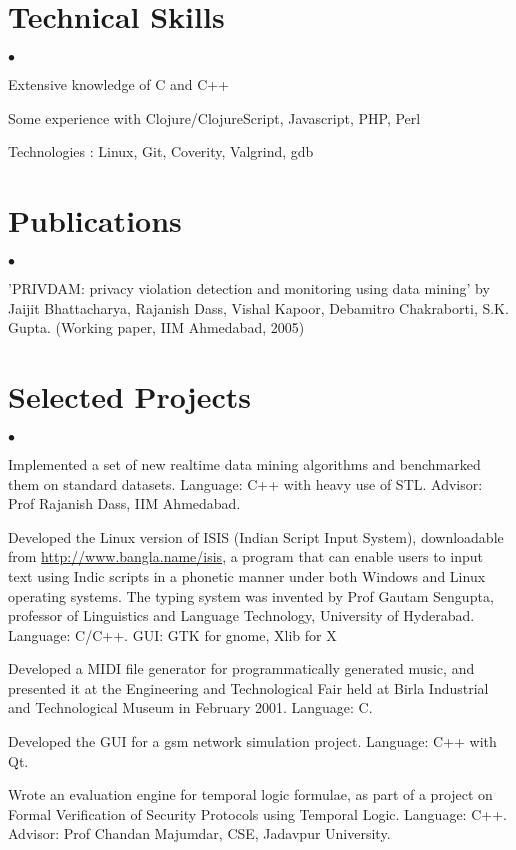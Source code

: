 \documentclass[margin,line]{res}
\newenvironment{list1}{
  \begin{list}{$\bullet$}{%
      \setlength{\itemsep}{0in}
      \setlength{\parsep}{0in} \setlength{\parskip}{0in}
      \setlength{\topsep}{0in} \setlength{\partopsep}{0in}
      \setlength{\leftmargin}{0.17in}}}{\end{list}}
\begin{document}
\begin{resume}
\section{\sc Technical Skills}
\begin{list1}
	\item Extensive knowledge of C and C++
	\item Some experience with Clojure/ClojureScript, Javascript, PHP, Perl
	\item Technologies : Linux, Git, Coverity, Valgrind, gdb
\end{list1}

\section{\sc Publications}
\begin{list1}
	\item 'PRIVDAM: privacy violation detection and monitoring using data mining'
by Jaijit Bhattacharya, Rajanish Dass, Vishal Kapoor, Debamitro Chakraborti, S.K. Gupta.
(Working paper, IIM Ahmedabad, 2005)
\end{list1}

\section{\sc Selected Projects}
\begin{list1}
	\item Implemented a set of new realtime data mining algorithms and benchmarked them on standard datasets. Language: C++ with heavy use of STL. Advisor: Prof Rajanish Dass, IIM Ahmedabad.
	\item Developed the Linux version of ISIS (Indian Script Input System), downloadable from \url{http://www.bangla.name/isis}, a program that can enable users to input text using Indic scripts in a phonetic manner under both Windows and Linux operating systems. The typing system was invented by Prof Gautam Sengupta, professor of Linguistics and Language Technology, University of Hyderabad. Language: C/C++. GUI: GTK for gnome, Xlib for X
	\item Developed a MIDI file generator for programmatically generated music, and presented it at the Engineering and Technological Fair held at Birla Industrial and Technological Museum in February 2001. Language: C.
	\item Developed the GUI for a gsm network simulation project. Language: C++ with Qt.
	\item Wrote an evaluation engine for temporal logic formulae, as part of a project on Formal Verification of Security Protocols using Temporal Logic. Language: C++. Advisor: Prof Chandan Majumdar, CSE, Jadavpur University.
\end{list1}


\end{resume}
\end{document}
